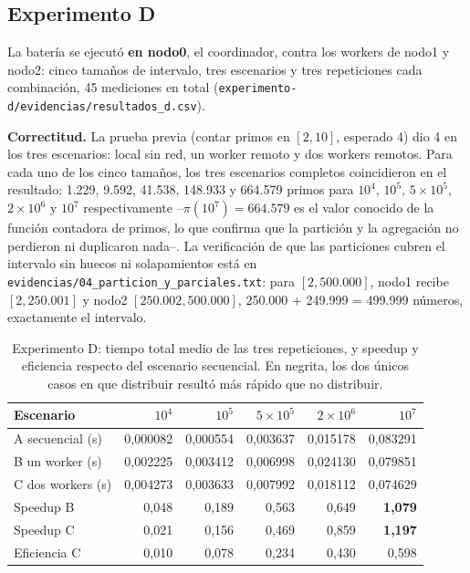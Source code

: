 \documentclass[11pt]{article}
\begin{document}
\subsection{Experimento D}

La batería se ejecutó \textbf{en nodo0}, el coordinador, contra los workers de
nodo1 y nodo2: cinco tamaños de intervalo, tres escenarios y tres repeticiones
cada combinación, 45 mediciones en total
(\texttt{experimento-d/evidencias/resultados\_d.csv}).

\textbf{Correctitud.} La prueba previa (contar primos en $[2,10]$, esperado 4)
dio 4 en los tres escenarios: local sin red, un worker remoto y dos workers
remotos. Para cada uno de los cinco tamaños, los tres escenarios completos
coincidieron en el resultado: 1.229, 9.592, 41.538, 148.933 y 664.579 primos
para $10^4$, $10^5$, $5\times10^5$, $2\times10^6$ y $10^7$ respectivamente
--$\pi(10^7)=664.579$ es el valor conocido de la función contadora de primos,
lo que confirma que la partición y la agregación no perdieron ni duplicaron
nada--. La verificación de que las particiones cubren el intervalo sin huecos
ni solapamientos está en \texttt{evidencias/04\_particion\_y\_parciales.txt}:
para $[2, 500.000]$, nodo1 recibe $[2, 250.001]$ y nodo2 $[250.002, 500.000]$,
250.000 + 249.999 = 499.999 números, exactamente el intervalo.

\begin{table}[h]
\centering
\small
\begin{tabular}{lrrrrr}
\toprule
Escenario & $10^4$ & $10^5$ & $5\times10^5$ & $2\times10^6$ & $10^7$ \\
\midrule
A secuencial (s)   & 0,000082 & 0,000554 & 0,003637 & 0,015178 & 0,083291 \\
B un worker (s)    & 0,002225 & 0,003412 & 0,006998 & 0,024130 & 0,079851 \\
C dos workers (s)  & 0,004273 & 0,003633 & 0,007992 & 0,018112 & 0,074629 \\
\midrule
Speedup B          & 0,048 & 0,189 & 0,563 & 0,649 & \textbf{1,079} \\
Speedup C          & 0,021 & 0,156 & 0,469 & 0,859 & \textbf{1,197} \\
Eficiencia C       & 0,010 & 0,078 & 0,234 & 0,430 & 0,598 \\
\bottomrule
\end{tabular}
\caption{Experimento D: tiempo total medio de las tres repeticiones, y speedup
y eficiencia respecto del escenario secuencial. En negrita, los dos únicos
casos en que distribuir resultó más rápido que no distribuir.}
\end{table}
\end{document}
